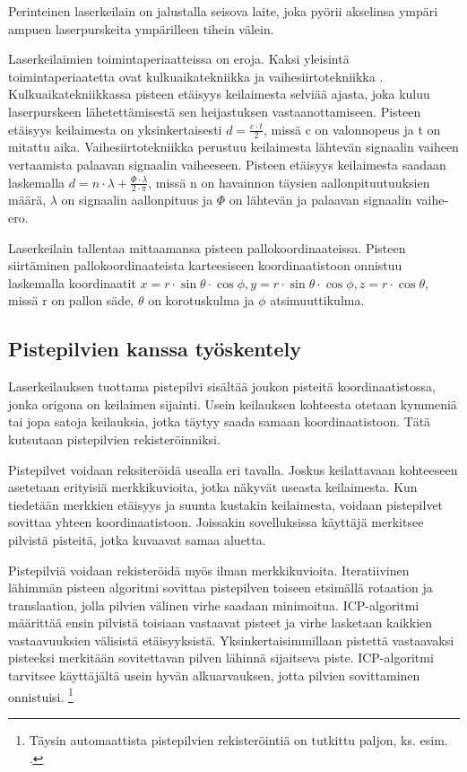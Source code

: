Perinteinen laserkeilain on jalustalla seisova laite, joka pyörii akselinsa ympäri ampuen laserpurskeita ympärilleen tihein välein. 

Laserkeilaimien toimintaperiaatteissa on eroja. Kaksi yleisintä toimintaperiaatetta ovat kulkuaikatekniikka  ja vaihesiirtotekniikka . Kulkuaikatekniikkassa pisteen etäisyys keilaimesta selviää ajasta, joka kuluu laserpurskeen lähetettämisestä sen heijastuksen vastaanottamiseen. Pisteen etäisyys keilaimesta on yksinkertaisesti $d=\frac{c\cdot t}{2}$, missä c on valonnopeus ja t on mitattu aika. \cite{fabritius}   
Vaihesiirtotekniikka perustuu keilaimesta lähtevän signaalin vaiheen vertaamista palaavan signaalin vaiheeseen. Pisteen etäisyys keilaimesta saadaan laskemalla $d=n\cdot \lambda + \frac{\Phi \cdot \lambda}{2 \cdot \pi}$, missä n on havainnon täysien aallonpituutuuksien määrä, $\lambda$ on signaalin aallonpituus ja $\Phi$ on lähtevän ja palaavan signaalin vaihe-ero. \cite{fabritius}

Laserkeilain tallentaa mittaamansa pisteen pallokoordinaateissa. Pisteen siirtäminen pallokoordinaateista karteesiseen koordinaatistoon onnistuu laskemalla koordinaatit $x=r \cdot \sin \theta \cdot \cos \phi, y=r \cdot \sin \theta \cdot \cos \phi, z=r \cdot \cos \theta$, missä r on pallon säde, $\theta$ on korotuskulma ja $\phi$ atsimuuttikulma.   



\subsection{Pistepilvien kanssa työskentely}

Laserkeilauksen tuottama pistepilvi sisältää joukon pisteitä koordinaatistossa, jonka origona on keilaimen sijainti. Usein keilauksen kohteesta otetaan kymmeniä tai jopa satoja keilauksia, jotka täytyy saada samaan koordinaatistoon. Tätä kutsutaan pistepilvien rekisteröinniksi. 

Pistepilvet voidaan reksiteröidä usealla eri tavalla. Joskus keilattavaan kohteeseen asetetaan erityisiä merkkikuvioita, jotka näkyvät useasta keilaimesta. Kun tiedetään merkkien etäisyys ja suunta kustakin keilaimesta, voidaan pistepilvet sovittaa yhteen koordinaatistoon. Joissakin sovelluksissa käyttäjä merkitsee pilvistä pisteitä, jotka kuvaavat samaa aluetta.

Pistepilviä voidaan rekisteröidä myös ilman merkkikuvioita. Iteratiivinen lähimmän pisteen algoritmi  sovittaa pistepilven toiseen etsimällä rotaation ja translaation,
jolla pilvien välinen virhe saadaan minimoitua. ICP-algoritmi määrittää ensin pilvistä toisiaan vastaavat pisteet ja virhe lasketaan kaikkien vastaavuuksien välisistä etäisyyksistä.
Yksinkertaisimmillaan pistettä vastaavaksi pisteeksi merkitään sovitettavan pilven lähinnä sijaitseva piste. 
ICP-algoritmi tarvitsee käyttäjältä usein hyvän alkuarvauksen, jotta pilvien sovittaminen onnistuisi. 
\footnote{Täysin automaattista pistepilvien rekisteröintiä on tutkittu paljon, ks. esim. \cite{Pascal}.}

